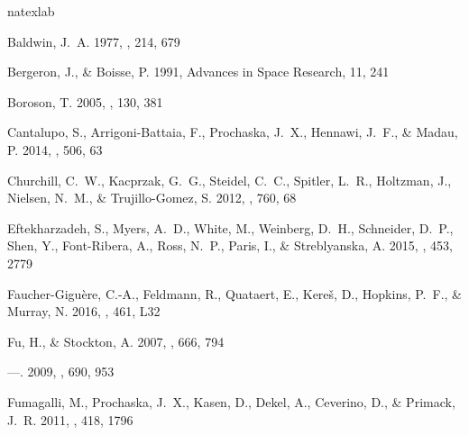 \documentclass[iop]{emulateapj}
\begin{document}
%
%

\begin{thebibliography}{52}
\expandafter\ifx\csname natexlab\endcsname\relax\def\natexlab#1{#1}\fi

{Baldwin}, J.~A. 1977, \apj, 214, 679

{Bergeron}, J., \& {Boisse}, P. 1991, Advances in Space Research, 11, 241

{Boroson}, T. 2005, \aj, 130, 381

{Cantalupo}, S., {Arrigoni-Battaia}, F., {Prochaska}, J.~X., {Hennawi}, J.~F.,
  \& {Madau}, P. 2014, \nat, 506, 63

{Churchill}, C.~W., {Kacprzak}, G.~G., {Steidel}, C.~C., {Spitler}, L.~R.,
  {Holtzman}, J., {Nielsen}, N.~M., \& {Trujillo-Gomez}, S. 2012, \apj, 760, 68

{Eftekharzadeh}, S., {Myers}, A.~D., {White}, M., {Weinberg}, D.~H.,
  {Schneider}, D.~P., {Shen}, Y., {Font-Ribera}, A., {Ross}, N.~P., {Paris},
  I., \& {Streblyanska}, A. 2015, \mnras, 453, 2779

{Faucher-Gigu{\`e}re}, C.-A., {Feldmann}, R., {Quataert}, E., {Kere{\v s}}, D.,
  {Hopkins}, P.~F., \& {Murray}, N. 2016, \mnras, 461, L32

{Fu}, H., \& {Stockton}, A. 2007, \apj, 666, 794

---. 2009, \apj, 690, 953

{Fumagalli}, M., {Prochaska}, J.~X., {Kasen}, D., {Dekel}, A., {Ceverino}, D.,
  \& {Primack}, J.~R. 2011, \mnras, 418, 1796


\end{thebibliography}
\end{document}
